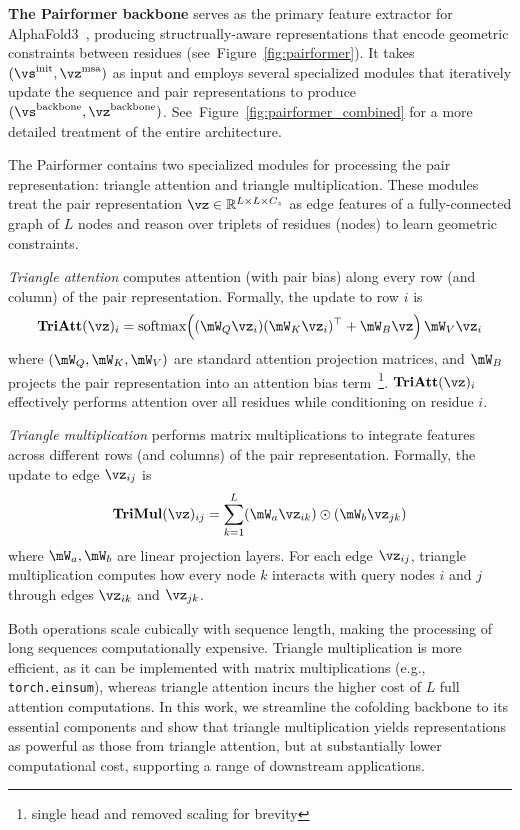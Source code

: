 \documentclass{article} %
\newcommand{\code}[1]{\texttt{#1}}
\renewcommand{\paragraph}[1]{\vspace{1.25mm}\noindent\textbf{#1}}
\newcommand{\reffig}[1]{Figure~\ref{fig:#1}}
\begin{document}
\paragraph{The Pairformer backbone} serves as the primary feature extractor for AlphaFold3~\citep{abramson2024alphafold3}, producing structrually-aware representations that encode geometric constraints between residues (see~\reffig{pairformer}).
It takes $(\vs^{\text{init}}, \vz^{\text{msa}})$ as input and employs several specialized modules that iteratively update the sequence and pair representations to produce $(\vs^{\text{backbone}}, \vz^{\text{backbone}})$.
See~\reffig{pairformer_combined} for a more detailed treatment of the entire architecture.

The Pairformer contains two specialized modules for processing the pair representation: triangle attention and triangle multiplication.
These modules treat the pair representation $\vz \in \mathbb{R}^{L \times L \times C_z}$ as edge features of a fully-connected graph of $L$ nodes and reason over triplets of residues (nodes) to learn geometric constraints.

\textit{Triangle attention} computes attention (with pair bias) along every row (and column) of the pair representation.
Formally, the update to row $i$ is
$$\mathbf{TriAtt}(\vz)_{i} = \text{softmax} \Big( (\mW_Q \vz_i)(\mW_K \vz_i)^\top + \mW_B \vz \Big)\, \mW_V \vz_i$$
where $(\mW_Q, \mW_K, \mW_V)$ are standard attention projection matrices, and $\mW_B$ projects the pair representation into an attention bias term~\footnote{single head and removed scaling for brevity}.
$\mathbf{TriAtt}(\vz)_{i}$ effectively performs attention over all residues while conditioning on residue $i$.


\textit{Triangle multiplication} performs matrix multiplications to integrate features across different rows (and columns) of the pair representation.
Formally, the update to edge $\vz_{ij}$ is 
$$\mathbf{TriMul}(\vz)_{ij} = \sum_{k=1}^L ( \mW_a \vz_{ik}) \odot (\mW_b \vz_{jk})$$
where $\mW_a, \mW_b$ are linear projection layers.
For each edge $\vz_{ij}$, triangle multiplication computes how every node $k$ interacts with query nodes $i$ and $j$ through edges $\vz_{ik}$ and $\vz_{jk}$.

Both operations scale cubically with sequence length, making the processing of long sequences computationally expensive. 
Triangle multiplication is more efficient, as it can be implemented with matrix multiplications (e.g., \code{torch.einsum}), 
whereas triangle attention incurs the higher cost of $L$ full attention computations. 
In this work, we streamline the cofolding backbone to its essential components and show that triangle multiplication yields representations as powerful as those from triangle attention, but at substantially lower computational cost, supporting a range of downstream applications.
\end{document}
